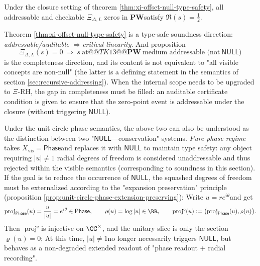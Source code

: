 \begin{corollary}\label{cor:xi-visible-zeros-on-critical-line}
Under the closure setting of theorem \ref{thm:xi-offset-null-type-safety}, all addressable and checkable \(\Xi_{\Delta,L}\) zeros in \(\mathbf{PW}\) ​​satisfy \(\Re(s)=\tfrac12\).
\end{corollary}

\begin{remark}\label{rem:xi-soundness-vs-completeness}
Theorem \ref{thm:xi-offset-null-type-safety} is a type-safe soundness direction: \emph{addressable/auditable} \(\Rightarrow\) ​​\emph{critical linearity}.
And proposition
\[
\Xi_{\Delta,L}(s)=0\ \Longrightarrow\ s\ \text{at}@@TK1 3@@\mathbf{PW}\ \text{medium addressable (not}\ \mathsf{NULL}\text{)}
\]
is the completeness direction, and its content is not equivalent to "all visible concepts are non-null" (the latter is a defining statement in the semantics of section \ref{sec:recursive-addressing}).
When the internal scope needs to be upgraded to \(\Xi\)-RH, the gap in completeness must be filled: an auditable certificate condition is given to ensure that the zero-point event is addressable under the closure (without triggering \(\mathsf{NULL}\)).
\par
Under the unit circle phase semantics, the above two can also be understood as the distinction between two "\(\mathsf{NULL}\)---conservation" systems.
\emph{Pure phase regime} takes \(X_{\mathrm{vis}}=\mathsf{Phase}\) ​​and replaces it with \(\mathsf{NULL}\) to maintain type safety: any object requiring \(|u|\neq 1\) radial degrees of freedom is considered unaddressable and thus rejected within the visible semantics (corresponding to soundness in this section).
If the goal is to reduce the occurrence of \(\mathsf{NULL}\), the squashed degrees of freedom must be externalized according to the "expansion preservation" principle (proposition \ref{prop:unit-circle-phase-extension-preserving}):
Write \(u=re^{i\theta}\) ​​and get
\[
\operatorname{proj}_{\mathsf{Phase}}(u)=\frac{u}{|u|}=e^{i\theta}\in\mathsf{Phase},
\qquad
\varrho(u)=\log|u|\in\RR,
\qquad
\operatorname{proj}^{\mathrm{e}}(u):=\bigl(\operatorname{proj}_{\mathsf{Phase}}(u),\varrho(u)\bigr).
\]
Then \(\operatorname{proj}^{\mathrm{e}}\) ​​is injective on \(\CC^\times\), and the unitary slice is only the section \(\varrho(u)=0\);
At this time, \(|u|\neq 1\) ​​no longer necessarily triggers \(\mathsf{NULL}\), but behaves as a non-degraded extended readout of "phase readout + radial recording".

\end{remark}
